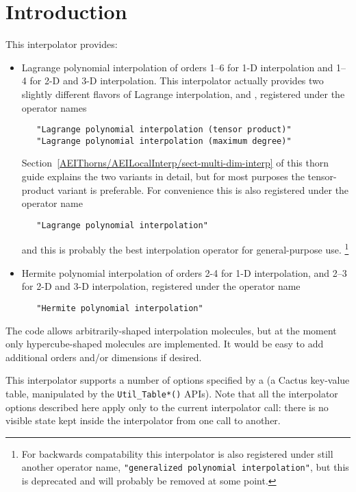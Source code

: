 
\section{Introduction}

This interpolator provides:
\begin{itemize}
\item	Lagrange polynomial interpolation of orders 1--6 for 1-D
	interpolation and 1--4 for 2-D and 3-D interpolation.
	This interpolator actually provides two slightly different
	flavors of Lagrange interpolation, 
	and , registered under the operator names
	\begin{verbatim}
   "Lagrange polynomial interpolation (tensor product)"
   "Lagrange polynomial interpolation (maximum degree)"
	\end{verbatim}
	Section~\ref{AEIThorns/AEILocalInterp/sect-multi-dim-interp}
	of this thorn guide explains the two variants in detail, but
	for most purposes the tensor-product variant is
	preferable.  For convenience this is also registered under
	the operator name
	\begin{verbatim}
   "Lagrange polynomial interpolation"
	\end{verbatim}
	and this is probably the best interpolation operator for
	general-purpose use.%
\footnote{%
	 For backwards compatability this interpolator
	 is also registered under still another operator name,
	 {\tt "generalized polynomial interpolation"}, but this
	 is deprecated and will probably be removed at some point.
	 }%
\item	Hermite polynomial interpolation of orders 2-4 for 1-D
	interpolation, and 2--3 for 2-D and 3-D interpolation,
	registered under the operator name
	\begin{verbatim}
   "Hermite polynomial interpolation"
	\end{verbatim}
\end{itemize}
The code allows arbitrarily-shaped interpolation molecules,
but at the moment only hypercube-shaped molecules are implemented.
It would be easy to add additional orders and/or dimensions if desired.

This interpolator supports a number of options specified by a
 (a Cactus key-value table, manipulated by the
\verb|Util_Table*()| APIs).  Note that all the interpolator options
described here apply only to the current interpolator call: there is
no visible state kept inside the interpolator from one call to another.

